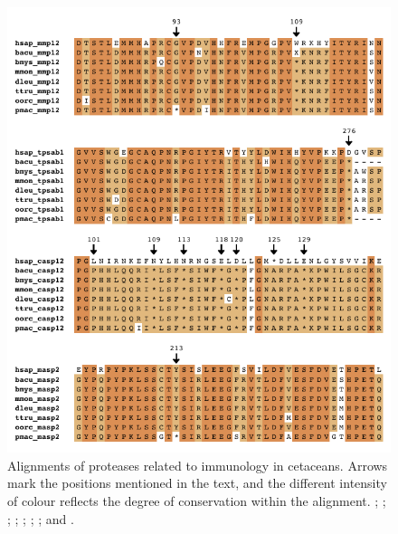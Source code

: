 \begin{figure}[t!]
    \begin{center}
        \includegraphics[width=\textwidth]{figures/alignment_immune.pdf}
        \caption[Alignments of proteases related to immunology in cetaceans]{\footnotesize Alignments of proteases related to immunology in cetaceans. Arrows mark the positions mentioned in the text, and the different intensity of colour reflects the degree of conservation within the alignment. \hsap; \bacu; \bmys; \mmon; \dleu; \ttru; \oorc; and \pmac.}
        \label{f_results_sperm_whale_alignments_inmuno}
    \end{center}
\end{figure}

